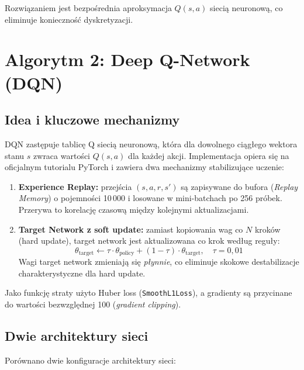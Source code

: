 \documentclass[12pt,a4paper]{article}
\begin{document}
Rozwiązaniem jest bezpośrednia aproksymacja $Q(s,a)$ siecią neuronową,
co eliminuje konieczność dyskretyzacji.

\section{Algorytm 2: Deep Q-Network (DQN)}

\subsection{Idea i kluczowe mechanizmy}

DQN zastępuje tablicę Q siecią neuronową, która dla dowolnego ciągłego
wektora stanu $s$ zwraca wartości $Q(s,a)$ dla każdej akcji.
Implementacja opiera się na oficjalnym tutorialu PyTorch i zawiera
dwa mechanizmy stabilizujące uczenie:

\begin{enumerate}
    \item \textbf{Experience Replay:} przejścia $(s, a, r, s')$ są
    zapisywane do bufora (\textit{Replay Memory}) o pojemności 10\,000
    i losowane w mini-batchach po 256 próbek. Przerywa to korelację
    czasową między kolejnymi aktualizacjami.

    \item \textbf{Target Network z soft update:} zamiast kopiowania
    wag co $N$ kroków (hard update), target network jest aktualizowana
    co krok według reguły:
    \begin{equation*}
        \theta_{\text{target}} \leftarrow \tau \cdot \theta_{\text{policy}}
        + (1-\tau) \cdot \theta_{\text{target}}, \quad \tau = 0{,}01
    \end{equation*}
    Wagi target network zmieniają się \emph{płynnie}, co eliminuje
    skokowe destabilizacje charakterystyczne dla hard update.
\end{enumerate}

Jako funkcję straty użyto Huber loss (\texttt{SmoothL1Loss}),
a gradienty są przycinane do wartości bezwzględnej 100
(\textit{gradient clipping}).

\subsection{Dwie architektury sieci}

Porównano dwie konfiguracje architektury sieci:
\end{document}
